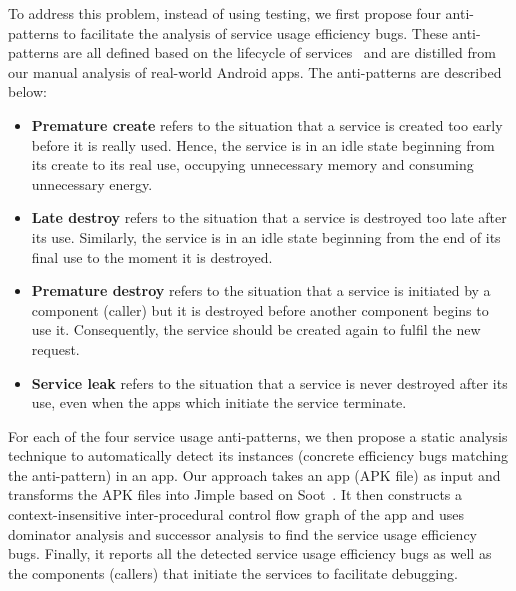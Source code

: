 \documentclass[conference]{IEEEtran}
\begin{document}

To address this problem, instead of using testing, we first propose four
anti-patterns to facilitate the analysis of service usage
efficiency bugs. These anti-patterns are all defined based on the lifecycle
of services~\cite{Androidservice} and are distilled from our manual analysis
of real-world Android apps. The anti-patterns are described below:
\begin{itemize}
  \item {\bf Premature create} refers to the situation that a
service is created too early before it is really used. Hence, the service is in
an idle state beginning from its create to its real use, occupying unnecessary
memory and consuming unnecessary energy.
\item  {\bf Late destroy} refers to the situation
that a service is destroyed too late after its use. Similarly, the service is in
an idle state beginning from the end of its final use to the moment it is destroyed.
\item {\bf Premature destroy} refers to the situation that a service is initiated by a
component (caller) but it is destroyed before another component begins to use
it. Consequently, the service should be created again to fulfil the new request.
\item {\bf Service leak} refers to the situation that a service is never destroyed
after its use, even when the apps which initiate the service terminate.
\end{itemize}

For each of the four service usage anti-patterns, we then propose a static
analysis technique to automatically detect its instances (concrete efficiency
bugs matching the anti-pattern) in an app.
Our approach takes an app (APK file) as input and transforms the APK files into
Jimple based on Soot~\cite{sootpaper}. It then constructs a
context-insensitive inter-procedural control flow graph of the app and uses
dominator analysis and successor analysis to find the service usage efficiency
bugs.
Finally, it reports all the
detected service usage efficiency bugs as well as the components (callers) that
initiate the services to facilitate debugging.
\end{document}
